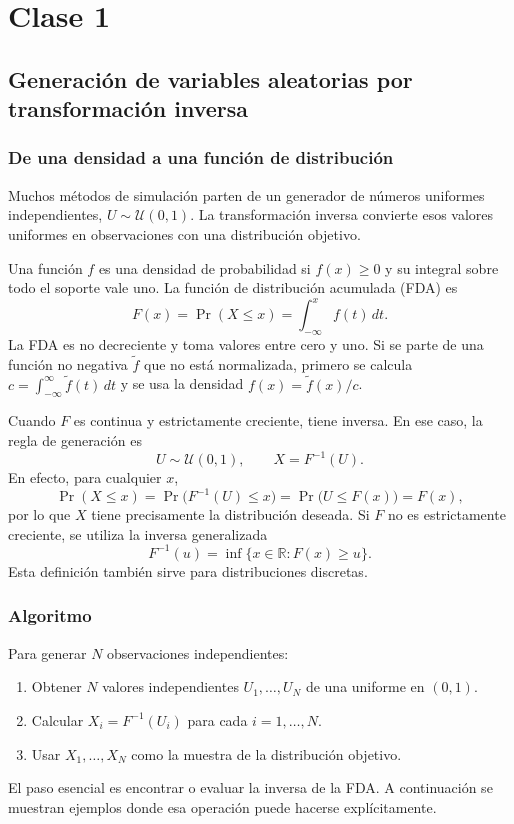 \section{Clase 1}
\subsection{Generación de variables aleatorias por transformación inversa}

\subsubsection{De una densidad a una función de distribución}

Muchos métodos de simulación parten de un generador de números uniformes
independientes, $U\sim\mathcal{U}(0,1)$. La transformación inversa convierte
esos valores uniformes en observaciones con una distribución objetivo.

Una función $f$ es una densidad de probabilidad si $f(x)\geq0$ y su integral
sobre todo el soporte vale uno. La función de distribución acumulada (FDA) es
\[
    F(x)=\Pr(X\leq x)=\int_{-\infty}^{x} f(t)\,dt.
\]
La FDA es no decreciente y toma valores entre cero y uno. Si se parte de una
función no negativa $\tilde f$ que no está normalizada, primero se calcula
$c=\int_{-\infty}^{\infty}\tilde f(t)\,dt$ y se usa la densidad
$f(x)=\tilde f(x)/c$.

Cuando $F$ es continua y estrictamente creciente, tiene inversa. En ese caso,
la regla de generación es
\[
    U\sim\mathcal{U}(0,1),\qquad X=F^{-1}(U).
\]
En efecto, para cualquier $x$,
\[
    \Pr(X\leq x)
    =\Pr\bigl(F^{-1}(U)\leq x\bigr)
    =\Pr\bigl(U\leq F(x)\bigr)
    =F(x),
\]
por lo que $X$ tiene precisamente la distribución deseada. Si $F$ no es
estrictamente creciente, se utiliza la inversa generalizada
\[
    F^{-1}(u)=\inf\{x\in\mathbb{R}:F(x)\geq u\}.
\]
Esta definición también sirve para distribuciones discretas.

\subsubsection{Algoritmo}

Para generar $N$ observaciones independientes:
\begin{enumerate}
    \item Obtener $N$ valores independientes $U_1,\ldots,U_N$ de una uniforme
    en $(0,1)$.
    \item Calcular $X_i=F^{-1}(U_i)$ para cada $i=1,\ldots,N$.
    \item Usar $X_1,\ldots,X_N$ como la muestra de la distribución objetivo.
\end{enumerate}
El paso esencial es encontrar o evaluar la inversa de la FDA\@. A continuación
se muestran ejemplos donde esa operación puede hacerse explícitamente.

